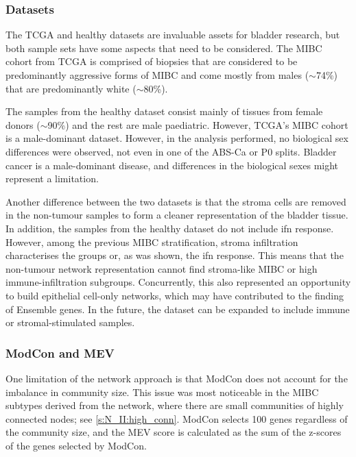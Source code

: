 \subsubsection*{Datasets}

The TCGA and healthy datasets are invaluable assets for bladder research, but both sample sets have some aspects that need to be considered. The MIBC cohort from TCGA is comprised of biopsies that are considered to be predominantly aggressive forms of MIBC and come mostly from males (\(\sim\)74\%) that are predominantly white (\(\sim\)80\%).

The samples from the healthy dataset consist mainly of tissues from female donors (\(\sim\)90\%) and the rest are male paediatric. However, TCGA's MIBC cohort is a male-dominant dataset. However, in the analysis performed, no biological sex differences were observed, not even in one of the ABS-Ca or P0 splits. Bladder cancer is a male-dominant disease, and differences in the biological sexes might represent a limitation.

Another difference between the two datasets is that the stroma cells are removed in the non-tumour samples to form a cleaner representation of the bladder tissue. In addition, the samples from the healthy dataset do not include \acrlong{ifn} response. However, among the previous MIBC stratification, stroma infiltration characterises the groups or, as was shown, the \acrshort{ifn} response. This means that the non-tumour network representation cannot find stroma-like MIBC or high immune-infiltration subgroups. Concurrently, this also represented an opportunity to build epithelial cell-only networks, which may have contributed to the finding of Ensemble genes. In the future, the dataset can be expanded to include immune or stromal-stimulated samples.


\subsubsection*{ModCon and MEV}

One limitation of the network approach is that ModCon does not account for the imbalance in community size. This issue was most noticeable in the MIBC subtypes derived from the network, where there are small communities of highly connected nodes; see \cref{s:N_II:high_conn}. ModCon selects 100 genes regardless of the community size, and the MEV score is calculated as the sum of the z-scores of the genes selected by ModCon.


